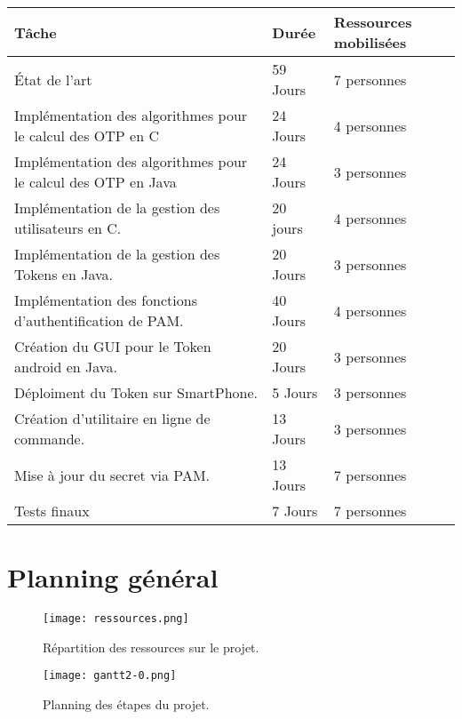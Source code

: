 \documentclass{../../res/univ-projet}
\begin{document}
	\begin{tabular}{|l|l|l|}
	 	\hline
		Tâche & Durée & Ressources mobilisées \\ 
		\hline
		État de l'art & 59 Jours & 7 personnes \\
		Implémentation des algorithmes pour le calcul des OTP en C & 24 Jours & 4 personnes \\
		Implémentation des algorithmes pour le calcul des OTP en Java & 24 Jours & 3 personnes \\
		Implémentation de la gestion des utilisateurs en C. & 20 jours & 4 personnes \\
		Implémentation de la gestion des Tokens en Java. & 20 Jours & 3 personnes \\
		Implémentation des fonctions d'authentification de PAM. & 40 Jours & 4 personnes \\
	  	Création du GUI pour le Token android en Java. & 20 Jours & 3 personnes \\
		Déploiment du Token sur SmartPhone. & 5 Jours & 3 personnes \\
	  	Création d'utilitaire en ligne de commande. & 13 Jours & 3 personnes \\
	  	Mise à jour du secret via PAM. & 13 Jours & 7 personnes \\
		Tests finaux & 7 Jours & 7 personnes \\ 
		\hline
	\end{tabular}

\newpage
\section{Planning général}
	\begin{figure}[h!]
		\texttt{[image: ressources.png]}
		\caption{Répartition des ressources sur le projet.}
	\end{figure}
	
	\newpage
	
	\begin{figure}[h!]
		\texttt{[image: gantt2-0.png]}
		\caption{Planning des étapes du projet.}
	\end{figure}
	
\end{document}
